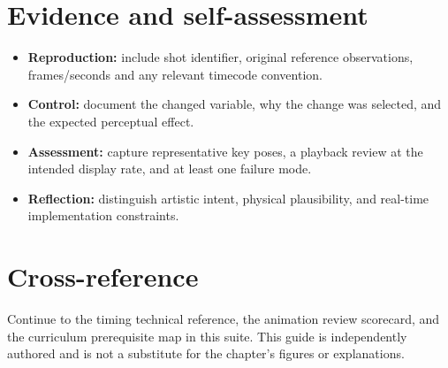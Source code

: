 \documentclass[10pt,letterpaper]{article}
\begin{document}
\section{Evidence and self-assessment}
\begin{itemize}
\item \textbf{Reproduction:} include shot identifier, original reference observations, frames/seconds and any relevant timecode convention.
\item \textbf{Control:} document the changed variable, why the change was selected, and the expected perceptual effect.
\item \textbf{Assessment:} capture representative key poses, a playback review at the intended display rate, and at least one failure mode.
\item \textbf{Reflection:} distinguish artistic intent, physical plausibility, and real-time implementation constraints.
\end{itemize}
\section{Cross-reference}
Continue to the timing technical reference, the animation review scorecard, and the curriculum prerequisite map in this suite. This guide is independently authored and is not a substitute for the chapter's figures or explanations.
\end{document}

